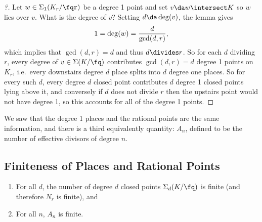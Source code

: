 \begin{proof}[?]

Let \(w\in \Sigma_1(K_r/\fqr)\) be a degree 1 point and set
\(v \da w\intersect K\) so \(w\) lies over \(v\). What is the degree of
\(v\)? Setting \(d \da \deg(v)\), the lemma gives
\begin{align*}  
1 = \deg(w) = {d\over \gcd(d, r)}
,\end{align*} which implies that \(\gcd(d, r) = d\) and thus
\(d\divides r\). So for each \(d\) dividing \(r\), every degree of
\(v\in \Sigma(K/\fq)\) contributes \(\gcd(d, r) = d\) degree 1 points on
\(K_r\), i.e.~every downstairs degree \(d\) place splits into \(d\)
degree one places. So for every such \(d\), every degree \(d\) closed
point contributes \(d\) degree 1 closed points lying above it, and
conversely if \(d\) does not divide \(r\) then the upstairs point would
not have degree 1, so this accounts for all of the degree 1 points.

\end{proof}

\begin{remark}

We saw that the degree 1 places and the rational points are the same
information, and there is a third equivalently quantity: \(A_n\),
defined to be the number of effective divisors of degree \(n\).

\end{remark}

\hypertarget{finiteness-of-places-and-rational-points}{%
\subsection{Finiteness of Places and Rational
Points}\label{finiteness-of-places-and-rational-points}}

\begin{lemma}[?]

\envlist

\begin{enumerate}
\def\labelenumi{\alph{enumi}.}
\item
  For all \(d\), the number of degree \(d\) closed points
  \(\Sigma_d(K/\fq)\) is finite (and therefore \(N_r\) is finite), and
\item
  For all \(n\), \(A_n\) is finite.
\end{enumerate}

\end{lemma}

